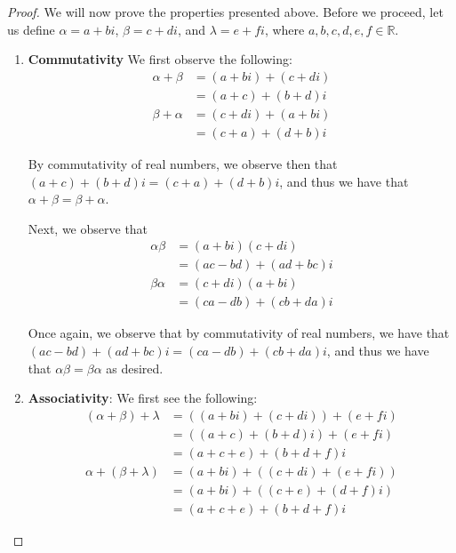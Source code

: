 \documentclass[openany]{book}
\newenvironment{innerproof}{\renewcommand{\qedsymbol}{$\square$}\proof}{\endproof}
\renewcommand\qedsymbol{$\blacksquare$}
\newcommand{\RR}{\mathbb{R}}
\begin{document}
\begin{proof}
	We will now prove the properties presented above. Before we proceed, let us define $\alpha = a + bi$, $\beta = c + di$, and $\lambda = e + fi$, where $a, b, c, d, e, f \in \RR$.
	
	\begin{enumerate}
		\item \textbf{Commutativity}
		\begin{innerproof}
			We first observe the following:
			\begin{align*}
				\alpha + \beta &= (a + bi) + (c + di) \\
				&= (a + c) + (b + d)i \\
				\beta + \alpha &= (c + di) + (a + bi) \\
				&= (c + a) + (d + b)i
			\end{align*}
		
			By commutativity of real numbers, we observe then that $(a + c) + (b + d)i = (c + a) + (d + b)i$, and thus we have that $\alpha + \beta = \beta + \alpha$.
			
			Next, we observe that
			\begin{align*}
				\alpha\beta &= (a+bi)(c+di) \\
				&= (ac - bd) + (ad + bc)i \\
				\beta\alpha &= (c+di)(a+bi) \\
				&= (ca - db) + (cb + da)i
			\end{align*}
		
			Once again, we observe that by commutativity of real numbers, we have that $(ac - bd) + (ad + bc)i = (ca - db) + (cb + da)i$, and thus we have that $\alpha\beta = \beta\alpha$ as desired.
		\end{innerproof}
	
		\item \textbf{Associativity}:
		\begin{innerproof}
			We first see the following:
			\begin{align*}
				(\alpha + \beta) + \lambda &= ( (a+bi) + (c + di)) + (e + fi) \\
				&= ( (a+c) + (b+d)i) + (e + fi) \\
				&= (a + c + e) + (b + d + f)i \\
				\alpha + (\beta + \lambda) &= (a + bi) + ( (c + di) + (e+fi)) \\
				&= (a+bi) + ( (c+e) + (d + f)i) \\
				&= (a + c + e) + (b + d +f)i
			\end{align*}
		

\end{innerproof}
\end{enumerate}
\end{proof}
\end{document}
